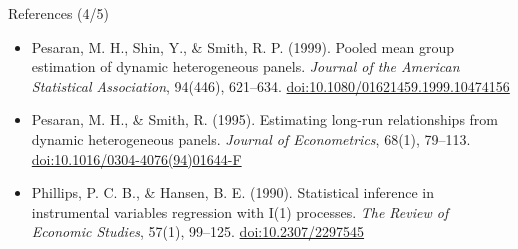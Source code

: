 \begin{frame}{References (4/5)}
\begin{itemize}
    \item Pesaran, M. H., Shin, Y., \& Smith, R. P. (1999). Pooled mean group estimation of dynamic heterogeneous panels. \textit{Journal of the American Statistical Association}, 94(446), 621--634. \href{https://doi.org/10.1080/01621459.1999.10474156}{doi:10.1080/01621459.1999.10474156}
    \item Pesaran, M. H., \& Smith, R. (1995). Estimating long-run relationships from dynamic heterogeneous panels. \textit{Journal of Econometrics}, 68(1), 79--113. \href{https://doi.org/10.1016/0304-4076(94)01644-F}{doi:10.1016/0304-4076(94)01644-F}
    \item Phillips, P. C. B., \& Hansen, B. E. (1990). Statistical inference in instrumental variables regression with I(1) processes. \textit{The Review of Economic Studies}, 57(1), 99--125. \href{https://doi.org/10.2307/2297545}{doi:10.2307/2297545}
\end{itemize}
\end{frame}

